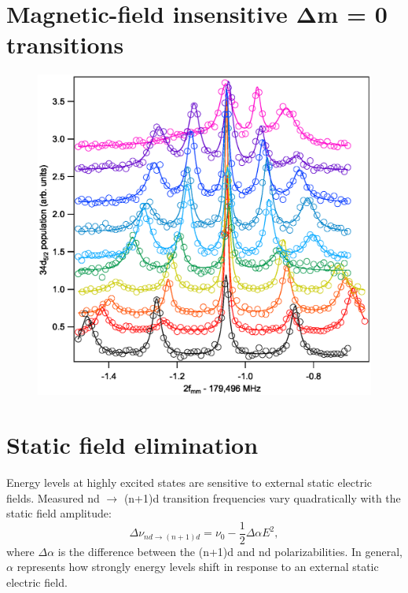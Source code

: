 \documentclass[landscape]{sciposter}
\begin{document}
\begin{multicols}{4}
\section*{Magnetic-field insensitive $\mathbf{\Delta}$m = 0 transitions }
\begin{figure}
	\begin{center}
		\includegraphics[scale=0.75]{delta_m_0.eps}
	\end{center}
\end{figure}
\section*{Static field elimination}
Energy levels at highly excited states are sensitive to external static electric fields. Measured nd $\rightarrow$ (n+1)d transition frequencies vary quadratically with the static field amplitude:
{\Large $$\Delta \nu_{nd \rightarrow (n+1)d} = \nu_{0} - \frac{1}{2} \Delta \alpha E^2,$$}
where $\Delta \alpha$ is the difference between the (n+1)d and nd polarizabilities. In general, $\alpha$ represents how strongly energy levels shift in response to an external static electric field. 


\end{multicols}
\end{document}
